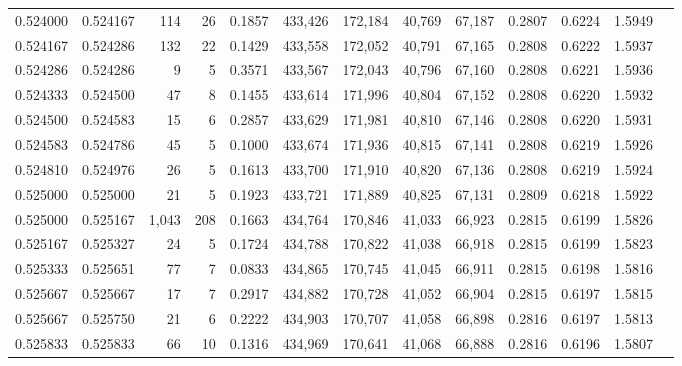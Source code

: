 \begin{tabular}{rrrrrrrrrrrrr}
0.524000 & 0.524167 &   114 &  26 &                                     0.1857 & 433,426 & 172,184 &  40,769 &  67,187 & 0.2807 & 0.6224 & 1.5949 \\
0.524167 & 0.524286 &   132 &  22 &                                     0.1429 & 433,558 & 172,052 &  40,791 &  67,165 & 0.2808 & 0.6222 & 1.5937 \\
0.524286 & 0.524286 &     9 &   5 &                                     0.3571 & 433,567 & 172,043 &  40,796 &  67,160 & 0.2808 & 0.6221 & 1.5936 \\
0.524333 & 0.524500 &    47 &   8 &                                     0.1455 & 433,614 & 171,996 &  40,804 &  67,152 & 0.2808 & 0.6220 & 1.5932 \\
0.524500 & 0.524583 &    15 &   6 &                                     0.2857 & 433,629 & 171,981 &  40,810 &  67,146 & 0.2808 & 0.6220 & 1.5931 \\
0.524583 & 0.524786 &    45 &   5 &                                     0.1000 & 433,674 & 171,936 &  40,815 &  67,141 & 0.2808 & 0.6219 & 1.5926 \\
0.524810 & 0.524976 &    26 &   5 &                                     0.1613 & 433,700 & 171,910 &  40,820 &  67,136 & 0.2808 & 0.6219 & 1.5924 \\
0.525000 & 0.525000 &    21 &   5 &                                     0.1923 & 433,721 & 171,889 &  40,825 &  67,131 & 0.2809 & 0.6218 & 1.5922 \\
0.525000 & 0.525167 & 1,043 & 208 &                                     0.1663 & 434,764 & 170,846 &  41,033 &  66,923 & 0.2815 & 0.6199 & 1.5826 \\
0.525167 & 0.525327 &    24 &   5 &                                     0.1724 & 434,788 & 170,822 &  41,038 &  66,918 & 0.2815 & 0.6199 & 1.5823 \\
0.525333 & 0.525651 &    77 &   7 &                                     0.0833 & 434,865 & 170,745 &  41,045 &  66,911 & 0.2815 & 0.6198 & 1.5816 \\
0.525667 & 0.525667 &    17 &   7 &                                     0.2917 & 434,882 & 170,728 &  41,052 &  66,904 & 0.2815 & 0.6197 & 1.5815 \\
0.525667 & 0.525750 &    21 &   6 &                                     0.2222 & 434,903 & 170,707 &  41,058 &  66,898 & 0.2816 & 0.6197 & 1.5813 \\
0.525833 & 0.525833 &    66 &  10 &                                     0.1316 & 434,969 & 170,641 &  41,068 &  66,888 & 0.2816 & 0.6196 & 1.5807 \\

\end{tabular}
